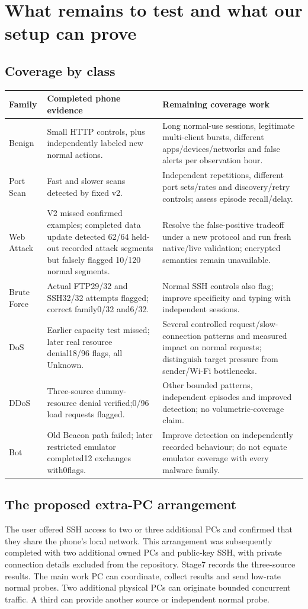 \documentclass[11pt,a4paper,oneside]{report}
\begin{document}
\chapter{What remains to test and what our setup can prove}
\section{Coverage by class}
\begin{longtable}{p{}p{}p{}}
\toprule Family & Completed phone evidence & Remaining coverage work\\\midrule\endhead
Benign & Small HTTP controls, plus independently labeled new normal actions. & Long normal-use sessions, legitimate multi-client bursts, different apps/devices/networks and false alerts per observation hour.\\
Port Scan & Fast and slower scans detected by fixed v2. & Independent repetitions, different port sets/rates and discovery/retry controls; assess episode recall/delay.\\
Web Attack & V2 missed confirmed examples; completed data update detected 62/64 held-out recorded attack segments but falsely flagged 10/120 normal segments. & Resolve the false-positive tradeoff under a new protocol and run fresh native/live validation; encrypted semantics remain unavailable.\\
Brute Force & Actual FTP29/32 and SSH32/32 attempts flagged; correct family0/32 and6/32. & Normal SSH controls also flag; improve specificity and typing with independent sessions.\\
DoS & Earlier capacity test missed; later real resource denial18/96 flags, all Unknown. & Several controlled request/slow-connection patterns and measured impact on normal requests; distinguish target pressure from sender/Wi-Fi bottlenecks.\\
DDoS & Three-source dummy-resource denial verified;0/96 load requests flagged. & Other bounded patterns, independent episodes and improved detection; no volumetric-coverage claim.\\
Bot & Old Beacon path failed; later restricted emulator completed12 exchanges with0flags. & Improve detection on independently recorded behaviour; do not equate emulator coverage with every malware family.\\
\bottomrule
\end{longtable}

\section{The proposed extra-PC arrangement}
The user offered SSH access to two or three additional PCs and confirmed that they share the phone's local network. This arrangement was subsequently completed with two additional owned PCs and public-key SSH, with private connection details excluded from the repository. Stage7 records the three-source results. The main work PC can coordinate, collect results and send low-rate normal probes. Two additional physical PCs can originate bounded concurrent traffic. A third can provide another source or independent normal probe.
\end{document}
